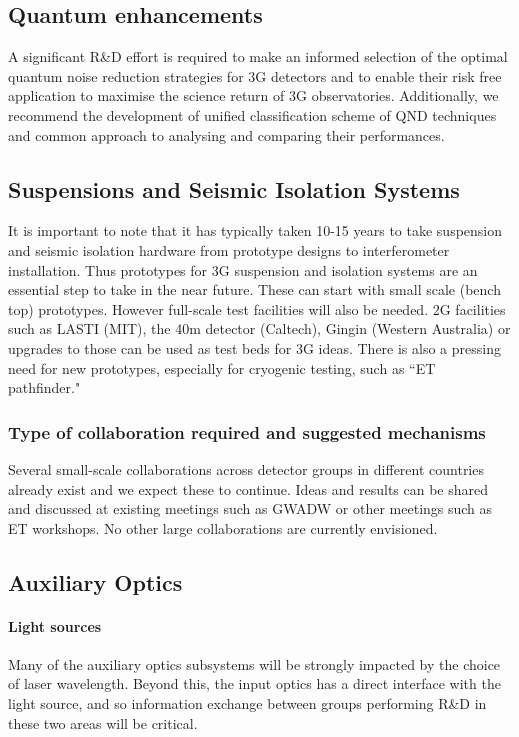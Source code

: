 \subsection{Quantum enhancements}
A significant R\&D effort is required to make an informed selection of the optimal quantum noise reduction strategies for 3G detectors and to enable their risk free application to maximise the science return of 3G observatories. Additionally, we recommend the development of unified classification scheme of QND techniques and common approach to analysing and comparing their performances.  


\subsection{Suspensions and Seismic Isolation Systems}

It is important to note that it has typically taken 10-15 years to take suspension and seismic isolation hardware from prototype designs to interferometer installation. Thus prototypes for 3G suspension and isolation systems are an essential step to take in the near future. These can start with small scale (bench top) prototypes. However full-scale test facilities will also be needed. 2G facilities such as LASTI (MIT), the 40m detector (Caltech), Gingin (Western Australia)
or upgrades to those can be used as test beds for 3G ideas. There is also a pressing need for new prototypes, especially for cryogenic testing, such as ``ET pathfinder."

\subsubsection{Type of collaboration required and suggested mechanisms}

Several small-scale collaborations across detector groups in different countries already exist and we expect these to continue.  Ideas and results can be shared and discussed at existing meetings such as GWADW or other meetings such as ET workshops. No other large collaborations are currently envisioned.

\subsection{Auxiliary Optics}

\paragraph{\bf Light sources} Many of the auxiliary optics subsystems will be strongly impacted by the choice of laser wavelength. Beyond this, the input optics has a direct interface with the light source, and so information exchange between groups performing R\&D in these two areas will be critical.
